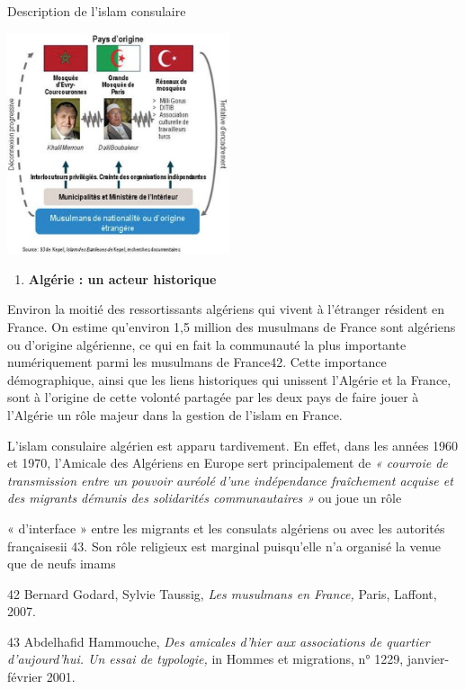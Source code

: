 Description de l'islam consulaire

\includegraphics[width=2.57628in,height=2.55833in]{ImageIslamFrance/media/image7.jpeg}

\begin{enumerate}
\def\labelenumi{\arabic{enumi}.}
\item
  \textbf{Algérie : un acteur historique}
\end{enumerate}


Environ la moitié des ressortissants algériens qui vivent à l'étranger
résident en France. On estime qu'environ 1,5 million des musulmans de
France sont algériens ou d'origine algérienne, ce qui en fait la
communauté la plus importante numériquement parmi les musulmans de
France42. Cette importance démographique, ainsi que les liens
historiques qui unissent l'Algérie et la France, sont à l'origine de
cette volonté partagée par les deux pays de faire jouer à l'Algérie un
rôle majeur dans la gestion de l'islam en France.

L'islam consulaire algérien est apparu tardivement. En effet, dans les
années 1960 et 1970, l'Amicale des Algériens en Europe sert
principalement de \emph{« courroie de transmission entre un pouvoir
auréolé d'une indépendance fraîchement acquise et des migrants démunis
des solidarités communautaires »} ou joue un rôle

« d'interface » entre les migrants et les consulats algériens ou avec
les autorités françaisesii 43. Son rôle religieux est marginal
puisqu'elle n'a organisé la venue que de neufs imams

42 Bernard Godard, Sylvie Taussig, \emph{Les musulmans en France,}
Paris, Laffont, 2007.

43 Abdelhafid Hammouche, \emph{Des amicales d'hier aux associations de
quartier d'aujourd'hui. Un essai de typologie,} in Hommes et migrations,
n° 1229, janvier-février 2001.

